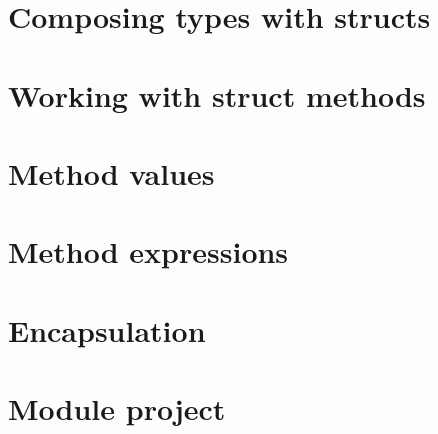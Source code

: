 \documentclass[]{book}
\begin{document}
\hypertarget{composing-types-with-structs}{%
\section{Composing types with structs}\label{composing-types-with-structs}}

\hypertarget{working-with-struct-methods}{%
\section{Working with struct methods}\label{working-with-struct-methods}}

\hypertarget{method-values}{%
\section{Method values}\label{method-values}}

\hypertarget{method-expressions}{%
\section{Method expressions}\label{method-expressions}}

\hypertarget{encapsulation}{%
\section{Encapsulation}\label{encapsulation}}

\hypertarget{module-project-4}{%
\section*{Module project}\label{module-project-4}}
\end{document}

